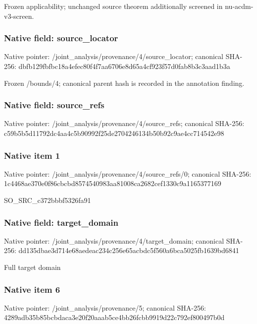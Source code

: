 \documentclass[10pt,a4paper]{article}
\begin{document}
\begingroup\raggedright\sloppy Frozen applicability;\allowbreak{} unchanged source theorem additionally screened in nu-acdm-v3-screen.\par\endgroup

\subsubsection{Native field: source\_\allowbreak{}locator}
Native pointer: /joint\_\allowbreak{}analysis/provenance/4/source\_\allowbreak{}locator; canonical SHA-256: dbfb129fbfbc18a4efec80f4f7aa6706e8d65a4cf923f57d0fab8b3c3aad1b3a

\begingroup\raggedright\sloppy Frozen /\allowbreak{}bounds/\allowbreak{}4;\allowbreak{} canonical parent hash is recorded in the annotation finding.\par\endgroup

\subsubsection{Native field: source\_\allowbreak{}refs}
Native pointer: /joint\_\allowbreak{}analysis/provenance/4/source\_\allowbreak{}refs; canonical SHA-256: c59b5b5d11792dc4aa4c5b90992f25de2704246134b50b92c9ae4cc714542e98

\subsubsection{Native item 1}
Native pointer: /joint\_\allowbreak{}analysis/provenance/4/source\_\allowbreak{}refs/0; canonical SHA-256: 1c4468ae370e0f86cbcbd8574540983aa81008ca2682cef1330c9a1165377169

\begingroup\raggedright\sloppy SO\_\allowbreak{}SRC\_\allowbreak{}c372bbbf5326fa91\par\endgroup

\subsubsection{Native field: target\_\allowbreak{}domain}
Native pointer: /joint\_\allowbreak{}analysis/provenance/4/target\_\allowbreak{}domain; canonical SHA-256: dd135dbae3d714e68aedeac234c256e65acbdc5f560a6bca5025fb1639bd6841

\begingroup\raggedright\sloppy Full target domain\par\endgroup

\subsubsection{Native item 6}
Native pointer: /joint\_\allowbreak{}analysis/provenance/5; canonical SHA-256: 4289adb35b85bcbdaca3e20f20aaab5ce4bb26fcbb9919d22c792ef800497b0d
\end{document}
